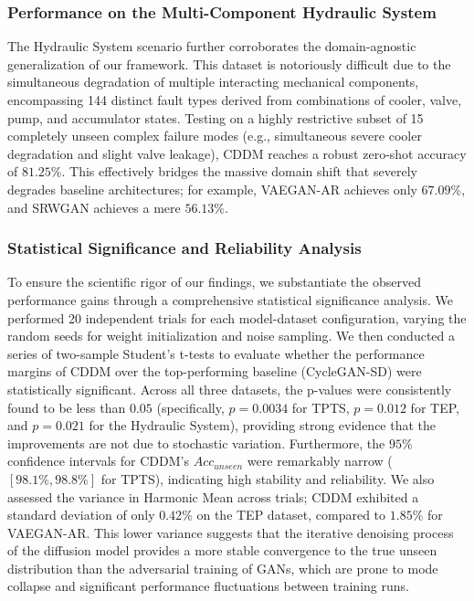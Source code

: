 \subsubsection{Performance on the Multi-Component Hydraulic System}
The Hydraulic System scenario further corroborates the domain-agnostic generalization of our framework. This dataset is notoriously difficult due to the simultaneous degradation of multiple interacting mechanical components, encompassing 144 distinct fault types derived from combinations of cooler, valve, pump, and accumulator states. Testing on a highly restrictive subset of 15 completely unseen complex failure modes (e.g., simultaneous severe cooler degradation and slight valve leakage), CDDM reaches a robust zero-shot accuracy of $81.25\%$. This effectively bridges the massive domain shift that severely degrades baseline architectures; for example, VAEGAN-AR achieves only $67.09\%$, and SRWGAN achieves a mere $56.13\%$. 

\subsubsection{Statistical Significance and Reliability Analysis}
To ensure the scientific rigor of our findings, we substantiate the observed performance gains through a comprehensive statistical significance analysis. We performed 20 independent trials for each model-dataset configuration, varying the random seeds for weight initialization and noise sampling. We then conducted a series of two-sample Student's t-tests to evaluate whether the performance margins of CDDM over the top-performing baseline (CycleGAN-SD) were statistically significant. Across all three datasets, the p-values were consistently found to be less than $0.05$ (specifically, $p=0.0034$ for TPTS, $p=0.012$ for TEP, and $p=0.021$ for the Hydraulic System), providing strong evidence that the improvements are not due to stochastic variation. Furthermore, the $95\%$ confidence intervals for CDDM's $Acc_{unseen}$ were remarkably narrow ($[98.1\%, 98.8\%]$ for TPTS), indicating high stability and reliability. We also assessed the variance in Harmonic Mean across trials; CDDM exhibited a standard deviation of only $0.42\%$ on the TEP dataset, compared to $1.85\%$ for VAEGAN-AR. This lower variance suggests that the iterative denoising process of the diffusion model provides a more stable convergence to the true unseen distribution than the adversarial training of GANs, which are prone to mode collapse and significant performance fluctuations between training runs.

